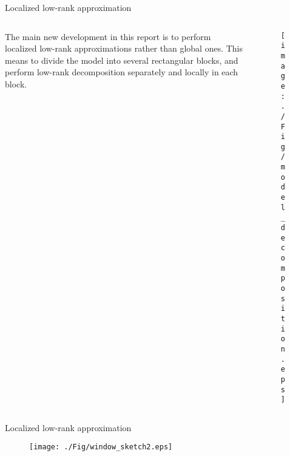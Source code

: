 \documentclass[aspectratio=169]{beamer}
\begin{document}
\begin{frame}{Localized low-rank approximation}

\begin{columns}
  \begin{column}{0.50\textwidth}
The main new development in this report is to perform localized low-rank approximations rather than global ones. This means to divide the model into several rectangular blocks, and perform low-rank decomposition separately and locally in each block. 
  \end{column}
  \begin{column}{0.50\textwidth}
  \begin{figure}
  \texttt{[image: ./Fig/model\_decomposition.eps]}
  \end{figure}
  \end{column}
\end{columns}

\end{frame}
\begin{frame}{Localized low-rank approximation}
  \begin{figure}
  \texttt{[image: ./Fig/window\_sketch2.eps]}
  \end{figure}

\end{frame}
\end{document}
